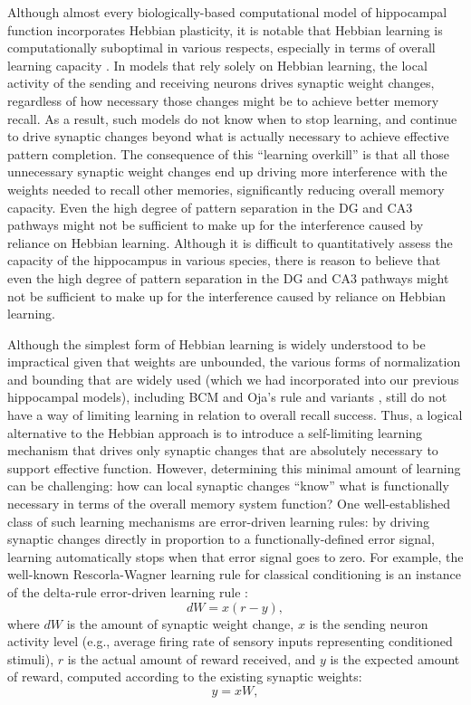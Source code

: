 \documentclass[11pt,twoside]{article}
\newif\myifpdf
\begin{document}
Although almost every biologically-based computational model of hippocampal function incorporates Hebbian plasticity, it is notable that Hebbian learning is computationally suboptimal in various respects, especially in terms of overall learning capacity \citep{Abu-MostafaSt.Jacques85,TrevesRolls91}.  In models that rely solely on Hebbian learning, the local activity of the sending and receiving neurons drives synaptic weight changes, regardless of how necessary those changes might be to achieve better memory recall.  As a result, such models do not know when to stop learning, and continue to drive synaptic changes beyond what is actually necessary to achieve effective pattern completion.  The consequence of this ``learning overkill'' is that all those unnecessary synaptic weight changes end up driving more interference with the weights needed to recall other memories, significantly reducing overall memory capacity. Even the high degree of pattern separation in the DG and CA3 pathways might not be sufficient to make up for the interference caused by reliance on Hebbian learning. Although it is difficult to quantitatively assess the capacity of the hippocampus in various species, there is reason to believe that even the high degree of pattern separation in the DG and CA3 pathways might not be sufficient to make up for the interference caused by reliance on Hebbian learning.

Although the simplest form of Hebbian learning is widely understood to be impractical given that weights are unbounded, the various forms of normalization and bounding that are widely used (which we had incorporated into our previous hippocampal models), including BCM \citep{BienenstockCooperMunro82} and Oja's rule and variants \citep{Oja89,OReillyMunakata00}, still do not have a way of limiting learning in relation to overall recall success.  Thus, a logical alternative to the Hebbian approach is to introduce a self-limiting learning mechanism that drives only synaptic changes that are absolutely necessary to support effective function.  However, determining this minimal amount of learning can be challenging: how can local synaptic changes ``know'' what is functionally necessary in terms of the overall memory system function?  One well-established class of such learning mechanisms are error-driven learning rules: by driving synaptic changes directly in proportion to a functionally-defined error signal, learning automatically stops when that error signal goes to zero. For example, the well-known Rescorla-Wagner learning rule for classical conditioning \citep{RescorlaWagner72} is an instance of the delta-rule error-driven learning rule \citep{WidrowHoff60}:
\begin{equation}
\label{eq.Rescorla-Wagner}
	dW = x (r - y) ,
\end{equation}
where $dW$ is the amount of synaptic weight change, $x$ is the sending neuron activity level (e.g., average firing rate of sensory inputs representing conditioned stimuli), $r$ is the actual amount of reward received, and $y$ is the expected amount of reward, computed according to the existing synaptic weights:
\begin{equation}
\label{eq.prepostsynaptic}
	y = xW ,
\end{equation}
\end{document}
